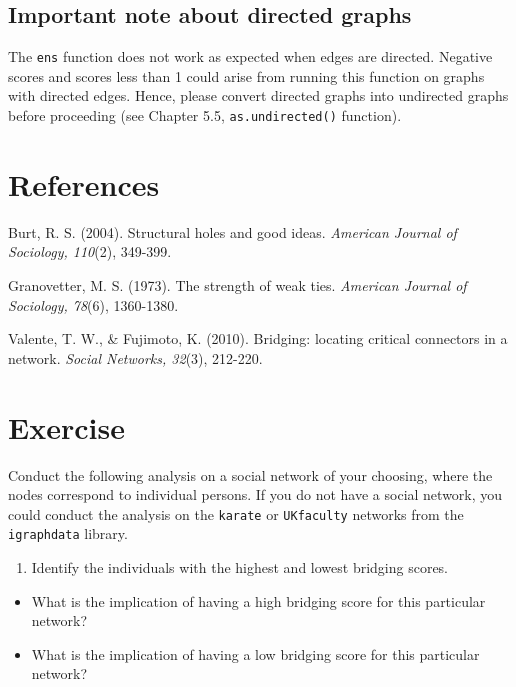 \documentclass[
]{book}
\providecommand{\tightlist}{%
  \setlength{\itemsep}{0pt}\setlength{\parskip}{0pt}}
\begin{document}
\subsection{Important note about directed graphs}\label{important-note-about-directed-graphs-1}

The \texttt{ens} function does not work as expected when edges are directed. Negative scores and scores less than 1 could arise from running this function on graphs with directed edges. Hence, please convert directed graphs into undirected graphs before proceeding (see Chapter 5.5, \texttt{as.undirected()} function).

\section{References}\label{references-2}

Burt, R. S. (2004). Structural holes and good ideas. \emph{American Journal of Sociology, 110}(2), 349-399.

Granovetter, M. S. (1973). The strength of weak ties. \emph{American Journal of Sociology, 78}(6), 1360-1380.

Valente, T. W., \& Fujimoto, K. (2010). Bridging: locating critical connectors in a network. \emph{Social Networks, 32}(3), 212-220.

\section{Exercise}\label{exercise-8}

Conduct the following analysis on a social network of your choosing, where the nodes correspond to individual persons. If you do not have a social network, you could conduct the analysis on the \texttt{karate} or \texttt{UKfaculty} networks from the \texttt{igraphdata} library.

\begin{enumerate}
\def\labelenumi{\arabic{enumi}.}
\tightlist
\item
  Identify the individuals with the highest and lowest bridging scores.
\end{enumerate}

\begin{itemize}
\tightlist
\item
  What is the implication of having a high bridging score for this particular network?
\item
  What is the implication of having a low bridging score for this particular network?
\end{itemize}
\end{document}
